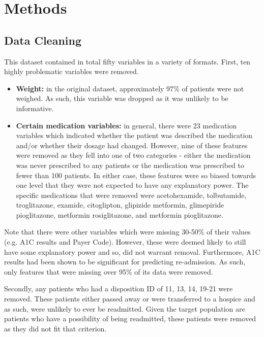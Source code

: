 \documentclass[letterpaper, 10 pt, conference]{ieeeconf}  %
\begin{document}
\section{Methods}

\subsection{Data Cleaning}

This dataset contained in total fifty variables in a variety of formats. First, ten highly problematic variables were removed. 

\begin{itemize}
    \item \textbf{Weight:} in the original dataset, approximately 97\% of patients were not weighed. As such, this variable was dropped as it was unlikely to be informative. 
    \item \textbf{Certain medication variables:} in general, there were 23 medication variables which indicated whether the patient was described the medication and/or whether their dosage had changed. However, nine of these features were removed as they fell into one of two categories - either the medication was never prescribed to any patients or the medication was prescribed to fewer than 100 patients. In either case, these features were so biased towards one level that they were not expected to have any explanatory power. The specific medications that were removed were acetohexamide, tolbutamide, troglitazone, examide, citoglipton, glipizide metformin, glimepiride pioglitazone, metformin rosiglitazone, and  metformin pioglitazone. 
\end{itemize}

Note that there were other variables which were missing 30-50\% of their values (e.g. A1C results and Payer Code). However, these were deemed likely to still have some explanatory power and so, did not warrant removal. Furthermore, A1C results had been shown to be significant for predicting re-admission. As such, only features that were missing over 95\% of its data were removed. 

Secondly, any patients who had a disposition ID of 11, 13, 14, 19-21 were removed. These patients either passed away or were transferred to a hospice and as such, were unlikely to ever be readmitted\cite{ref1}\cite{ref2}. Given the target population are patients who have a possibility of being readmitted, these patients were removed as they did not fit that criterion. 
\end{document}
